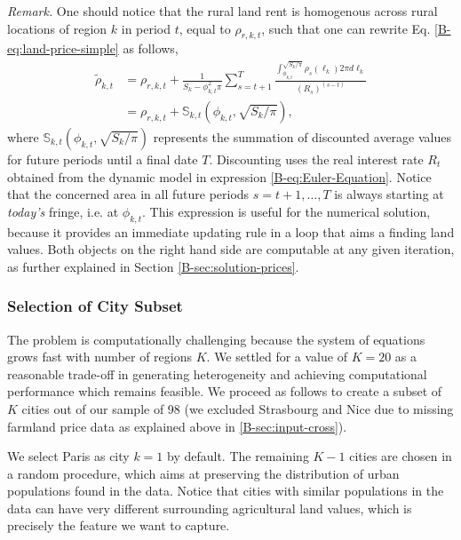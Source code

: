\documentclass[11pt]{report}
\begin{document}
\emph{Remark.} One should notice that the rural land rent is homogenous across rural locations of region $k$ in period $t$, equal to $\rho_{r,k,t}$, such that one can rewrite Eq. \ref{B-eq:land-price-simple} as follows,
	\begin{align}
	\tilde{\rho}_{k,t}
	& = \rho_{r,k,t} + \frac{1}{S_k - \phi_{k,t}^2 \pi}\sum_{s={t+1}}^T  \frac{\int_{\phi_{k,t}}^{\sqrt{S_k/\pi}} \rho_s(\ell_k)  2\pi d\ell_k}{(R_s)^{(s-t)}} \nonumber \\
	& = \rho_{r,k,t} + \mathbb{S}_{k,t}\left(\phi_{k,t}, \sqrt{S_k/\pi}\right), \label{B-eq:land-price}
	\end{align}
	where $\mathbb{S}_{k,t}\left(\phi_{k,t}, \sqrt{S_k/\pi}\right)$ represents the summation of discounted average values for future periods until a final date $T$. Discounting uses the real interest rate $R_t$ obtained from the dynamic model in expression \eqref{B-eq:Euler-Equation}. Notice that the concerned area in all future periods $s=t+1,\dots,T$ is always starting at \emph{today's} fringe, i.e. at $\phi_{k,t}$. This expression is useful for the numerical solution, because it provides an immediate updating rule in a loop that aims a finding land values. Both objects on the right hand side are computable at any given iteration, as further explained in Section \ref{B-sec:solution-prices}.



    
\subsubsection{Selection of City Subset}\label{B-sec:solution-city-subset}

The problem is computationally challenging because the system of equations grows fast with number of regions $K$. We settled for a value of $K=20$ as a reasonable trade-off in generating heterogeneity and achieving computational performance which remains feasible. We proceed as follows to create a subset of $K$ cities out of our sample of 98 (we excluded Strasbourg and Nice due to missing farmland price data as explained above in \ref{B-sec:input-cross}).

We select Paris as city $k=1$ by default. The remaining $K-1$ cities are chosen in a random procedure, which aims at preserving the distribution of urban populations found in the data. Notice that cities with similar populations in the data can have very different surrounding agricultural land values, which is precisely the feature we want to capture. 
\end{document}
